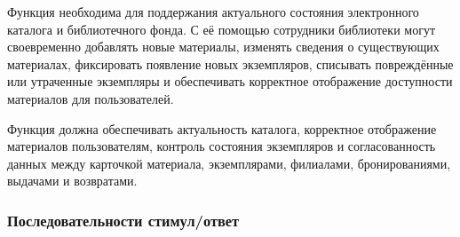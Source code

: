 \documentclass[12pt,a4paper]{article}
\begin{document}
	Функция необходима для поддержания актуального состояния электронного каталога
	и библиотечного фонда. С её помощью сотрудники библиотеки могут своевременно
	добавлять новые материалы, изменять сведения о существующих материалах,
	фиксировать появление новых экземпляров, списывать повреждённые или утраченные
	экземпляры и обеспечивать корректное отображение доступности материалов для
	пользователей.
	
	Функция должна обеспечивать актуальность каталога, корректное отображение
	материалов пользователям, контроль состояния экземпляров и согласованность данных
	между карточкой материала, экземплярами, филиалами, бронированиями, выдачами
	и возвратами.
	
	\subsubsection{Последовательности стимул/ответ}
	
\end{document}
